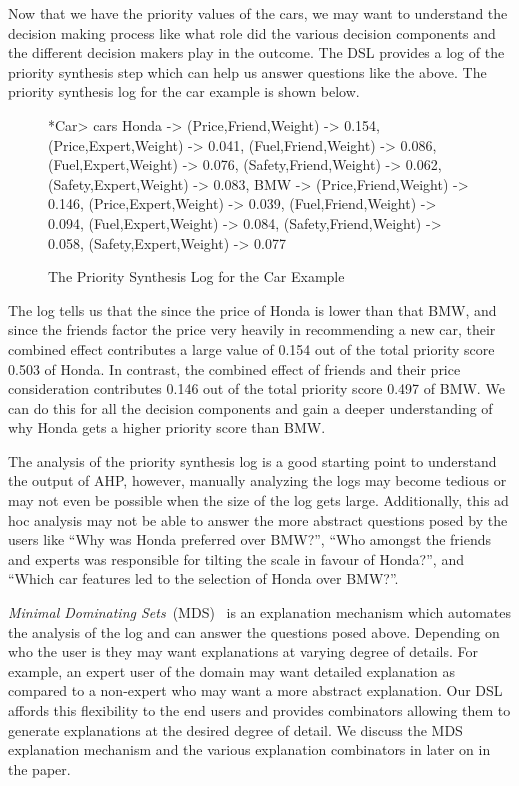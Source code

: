 \documentclass{jfp}
\begin{document}
Now that we have the priority values of the cars, we may want to understand the decision making process like what role did the various decision components and the different decision makers play in the outcome. The DSL provides a log of the priority synthesis step which can help us answer questions like the above. The priority synthesis log for the car example is shown below. 
\begin{figure}
    \centering
\begin{haskellcode}
*Car> cars
{Honda -> {(Price,Friend,Weight) -> 0.154,
           (Price,Expert,Weight) -> 0.041,
           (Fuel,Friend,Weight) -> 0.086,
           (Fuel,Expert,Weight) -> 0.076,
           (Safety,Friend,Weight) -> 0.062,
           (Safety,Expert,Weight) -> 0.083},
 BMW   -> {(Price,Friend,Weight) -> 0.146,
           (Price,Expert,Weight) -> 0.039,
           (Fuel,Friend,Weight) -> 0.094,
           (Fuel,Expert,Weight) -> 0.084,
           (Safety,Friend,Weight) -> 0.058,
           (Safety,Expert,Weight) -> 0.077}}
\end{haskellcode}
    \caption{The Priority Synthesis Log for the Car Example}
    \label{fig:my_label}
\end{figure}

The log tells us that the since the price of Honda is lower than that BMW, and since the friends factor the price very heavily in recommending a new car, their combined effect contributes a large value of 0.154 out of the total priority score 0.503 of Honda. In contrast, the combined effect of friends and their price consideration contributes 0.146 out of the total priority score 0.497 of BMW. We can do this for all the decision components and gain a deeper understanding of why Honda gets a higher priority score than BMW.

The analysis of the priority synthesis log is a good starting point to understand the output of AHP, however, manually analyzing the logs may become tedious or may not even be possible when the size of the log gets large. Additionally, this ad hoc analysis may not be able to answer the more abstract questions posed by the users like ``Why was Honda preferred over BMW?'', ``Who amongst the friends and experts was responsible for tilting the scale in favour of Honda?'', and ``Which car features led to the selection of Honda over BMW?''. 

\emph{Minimal Dominating Sets}~(MDS)~\citep{DBLP:conf/padl/ErwigKF20} is an explanation mechanism which automates the analysis of the log and can answer the questions posed above. Depending on who the user is they may want explanations at varying degree of details. For example, an expert user of the domain may want detailed explanation as compared to a non-expert who may want a more abstract explanation. Our DSL affords this flexibility to the end users and provides combinators allowing them to generate explanations at the desired degree of detail. We discuss the MDS explanation mechanism and the various explanation combinators in later on in the paper. 
\end{document}
